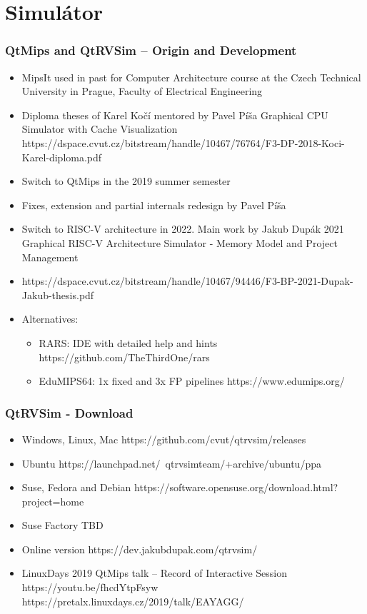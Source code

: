 \documentclass{beamer}
\subtitle{Lekce 04. Central Processing Unit (CPU)}
\author{Pavel Píša\\ \small\texttt{pisa@fel.cvut.cz}}
\begin{document}
\maketitle

\section{Simulátor}

\begin{frame}
\frametitle{QtMips and QtRVSim – Origin and Development}

\begin{itemize}
\item MipsIt used in past for Computer Architecture course at the Czech Technical University in Prague, Faculty of Electrical Engineering
\item Diploma theses of Karel Kočí mentored by Pavel Píša
Graphical CPU Simulator with Cache Visualization
https://dspace.cvut.cz/bitstream/handle/10467/76764/F3-DP-2018-Koci-Karel-diploma.pdf
\item Switch to QtMips in the 2019 summer semester
\item Fixes, extension and partial internals redesign by Pavel Píša
\item Switch to RISC-V architecture in 2022. Main work by Jakub Dupák 2021
Graphical RISC-V Architecture Simulator - Memory Model and Project Management
\item https://dspace.cvut.cz/bitstream/handle/10467/94446/F3-BP-2021-Dupak-Jakub-thesis.pdf

\item Alternatives:
\begin{itemize}
 \item RARS: IDE with detailed help and hints
 https://github.com/TheThirdOne/rars
 \item EduMIPS64: 1x fixed and 3x FP pipelines
 https://www.edumips.org/
\end{itemize}
\end{itemize}

\end{frame}


\begin{frame}
\frametitle{QtRVSim - Download}
\begin{itemize}
\item Windows, Linux, Mac
https://github.com/cvut/qtrvsim/releases
\item  Ubuntu
https://launchpad.net/~qtrvsimteam/+archive/ubuntu/ppa
\item Suse, Fedora and Debian
https://software.opensuse.org/download.html?project=home%
\item Suse Factory
TBD
\item Online version
https://dev.jakubdupak.com/qtrvsim/
\item LinuxDays 2019 QtMips talk – Record of Interactive Session
https://youtu.be/fhcdYtpFsyw
https://pretalx.linuxdays.cz/2019/talk/EAYAGG/
\end{itemize}
\end{frame}
\end{document}
